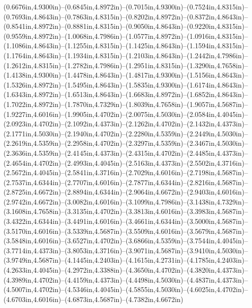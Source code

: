 (0.6676in,4.9300in)--(0.6845in,4.8972in)--(0.7015in,4.9300in)--(0.7524in,4.8315in)--(0.7693in,4.8643in)--(0.7863in,4.8315in)--(0.8202in,4.8972in)--(0.8372in,4.8643in)--(0.8541in,4.8972in)--(0.8881in,4.8315in)--(0.9050in,4.8643in)--(0.9220in,4.8315in)--(0.9559in,4.8972in)--(1.0068in,4.7986in)--(1.0577in,4.8972in)--(1.0916in,4.8315in)--(1.1086in,4.8643in)--(1.1255in,4.8315in)--(1.1425in,4.8643in)--(1.1594in,4.8315in)--(1.1764in,4.8643in)--(1.1934in,4.8315in)--(1.2103in,4.8643in)--(1.2442in,4.7986in)--(1.2612in,4.8315in)--(1.2782in,4.7986in)--(1.2951in,4.8315in)--(1.3290in,4.7658in)--(1.4138in,4.9300in)--(1.4478in,4.8643in)--(1.4817in,4.9300in)--(1.5156in,4.8643in)--(1.5326in,4.8972in)--(1.5495in,4.8643in)--(1.5835in,4.9300in)--(1.6174in,4.8643in)--(1.6343in,4.8972in)--(1.6513in,4.8643in)--(1.6683in,4.8972in)--(1.6852in,4.8643in)--(1.7022in,4.8972in)--(1.7870in,4.7329in)--(1.8039in,4.7658in)--(1.9057in,4.5687in)--(1.9227in,4.6016in)--(1.9905in,4.4702in)--(2.0075in,4.5030in)--(2.0584in,4.4045in)--(2.0923in,4.4702in)--(2.1092in,4.4373in)--(2.1262in,4.4702in)--(2.1432in,4.4373in)--(2.1771in,4.5030in)--(2.1940in,4.4702in)--(2.2280in,4.5359in)--(2.2449in,4.5030in)--(2.2619in,4.5359in)--(2.2958in,4.4702in)--(2.3297in,4.5359in)--(2.3467in,4.5030in)--(2.3636in,4.5359in)--(2.4145in,4.4373in)--(2.4315in,4.4702in)--(2.4485in,4.4373in)--(2.4654in,4.4702in)--(2.4993in,4.4045in)--(2.5163in,4.4373in)--(2.5502in,4.3716in)--(2.5672in,4.4045in)--(2.5841in,4.3716in)--(2.7029in,4.6016in)--(2.7198in,4.5687in)--(2.7537in,4.6344in)--(2.7707in,4.6016in)--(2.7877in,4.6344in)--(2.8216in,4.5687in)--(2.8725in,4.6672in)--(2.8894in,4.6344in)--(2.9064in,4.6672in)--(2.9403in,4.6016in)--(2.9742in,4.6672in)--(3.0082in,4.6016in)--(3.1099in,4.7986in)--(3.1438in,4.7329in)--(3.1608in,4.7658in)--(3.3135in,4.4702in)--(3.3813in,4.6016in)--(3.3983in,4.5687in)--(3.4322in,4.6344in)--(3.4491in,4.6016in)--(3.4661in,4.6344in)--(3.5000in,4.5687in)--(3.5170in,4.6016in)--(3.5339in,4.5687in)--(3.5509in,4.6016in)--(3.5679in,4.5687in)--(3.5848in,4.6016in)--(3.6527in,4.4702in)--(3.6866in,4.5359in)--(3.7544in,4.4045in)--(3.7714in,4.4373in)--(3.8053in,4.3716in)--(3.9071in,4.5687in)--(3.9410in,4.5030in)--(3.9749in,4.5687in)--(4.1445in,4.2403in)--(4.1615in,4.2731in)--(4.1785in,4.2403in)--(4.2633in,4.4045in)--(4.2972in,4.3388in)--(4.3650in,4.4702in)--(4.3820in,4.4373in)--(4.3989in,4.4702in)--(4.4159in,4.4373in)--(4.4498in,4.5030in)--(4.4837in,4.4373in)--(4.5007in,4.4702in)--(4.5346in,4.4045in)--(4.5855in,4.5030in)--(4.6025in,4.4702in)--(4.6703in,4.6016in)--(4.6873in,4.5687in)--(4.7382in,4.6672in) 